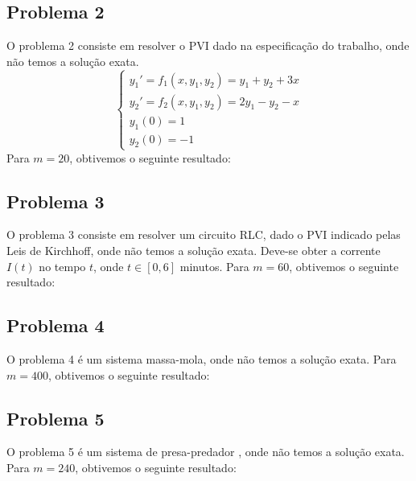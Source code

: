 \subsection*{Problema 2}
O problema 2 consiste em resolver o PVI dado na especificação do trabalho, onde não temos a solução exata.
$$
\left\{
    \begin{array}{l}
        y_1' = f_1(x, y_1, y_2) = y_1 + y_2 + 3x \\
        y_2' = f_2(x, y_1, y_2) = 2y_1 - y_2 - x \\
        y_1(0) = 1 \\
        y_2(0) = -1
    \end{array}
\right.
$$
Para $m = 20$, obtivemos o seguinte resultado:



\subsection*{Problema 3}
O problema 3 consiste em resolver um circuito RLC, dado o PVI indicado pelas Leis de Kirchhoff, onde não temos a solução exata. Deve-se obter a corrente $I(t)$ no tempo $t$, onde $t \in [0, 6]$ minutos.
Para $m = 60$, obtivemos o seguinte resultado:



\subsection*{Problema 4}
O problema 4 é um sistema massa-mola, onde não temos a solução exata.
Para $m = 400$, obtivemos o seguinte resultado:



\subsection*{Problema 5}
O problema 5 é um sistema de presa-predador , onde não temos a solução exata.
Para $m = 240$, obtivemos o seguinte resultado:


